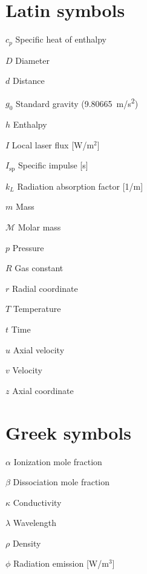 \begin{multicols*}{2}
    \section*{Latin symbols}
    \begin{nomlist}
        \item[$c_p$]           Specific heat of enthalpy
        \item[$D$]             Diameter
        \item[$d$]             Distance
        \item[$g_0$]           Standard gravity (9.80665~\unit{m/s^2}) 
        \item[$h$          ]   Enthalpy
        \item[$I$          ]   Local laser flux [W/m$^2$]
        \item[$I_\text{sp}$]   Specific impulse [s]
        \item[$k_L$        ]   Radiation absorption factor [1/m]
        \item[$m$]             Mass
        \item[$\mathcal{M}$]   Molar mass
        \item[$p$          ]   Pressure
        \item[$R$]             Gas constant
        \item[$r$          ]   Radial coordinate
        \item[$T$          ]   Temperature
        \item[$t$          ]   Time
        \item[$u$          ]   Axial velocity
        \item[$v$]             Velocity 
        \item[$z$          ]   Axial coordinate
    \end{nomlist}

    \section*{Greek symbols}
    \begin{nomlist}
        \item[$\alpha$]    Ionization mole fraction
        \item[$\beta$]     Dissociation mole fraction
        \item[$\kappa$]    Conductivity
        \item[$\lambda$]   Wavelength
        \item[$\rho$  ]    Density
        \item[$\phi$  ]    Radiation emission [W/m$^3$]
    \end{nomlist}


\end{multicols*}
